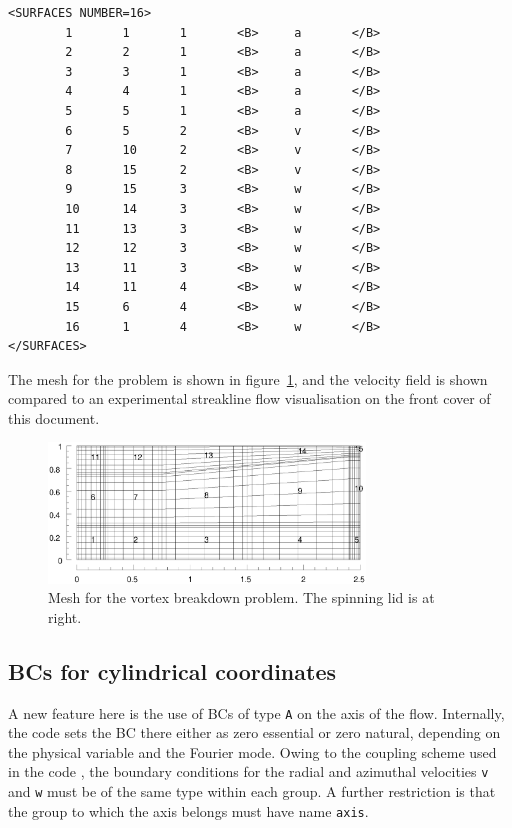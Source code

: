 \documentclass[11pt,a4paper]{report}
\begin{document}
{\begin{verbatim}
<SURFACES NUMBER=16>
        1       1       1       <B>     a       </B>
        2       2       1       <B>     a       </B>
        3       3       1       <B>     a       </B>
        4       4       1       <B>     a       </B>
        5       5       1       <B>     a       </B>
        6       5       2       <B>     v       </B>
        7       10      2       <B>     v       </B>
        8       15      2       <B>     v       </B>
        9       15      3       <B>     w       </B>
        10      14      3       <B>     w       </B>
        11      13      3       <B>     w       </B>
        12      12      3       <B>     w       </B>
        13      11      3       <B>     w       </B>
        14      11      4       <B>     w       </B>
        15      6       4       <B>     w       </B>
        16      1       4       <B>     w       </B>
</SURFACES>
\end{verbatim}
}

The mesh for the problem is shown in figure~\ref{vb1msh}, and the
velocity field is shown compared to an experimental streakline flow
visualisation on the front cover of this document.
\begin{figure}
\begin{center}
\includegraphics[width=0.75\textwidth]{vb1mesh.eps}
\end{center}
\caption{
\label{vb1msh}
  Mesh for the vortex breakdown problem.  The spinning lid is at right.
  }
\end{figure}

\subsection{BCs for cylindrical coordinates}

A new feature here is the use of BCs of type \verb+A+ on the axis of
the flow.  Internally, the code sets the BC there either as zero
essential or zero natural, depending on the physical variable and the
Fourier mode.  Owing to the coupling scheme used in the code
\cite{blsh04}, the boundary conditions for the radial and azimuthal
velocities \verb+v+ and \verb+w+ must be of the same type within each
group.  A further restriction is that the group to which the axis
belongs must have name \verb+axis+.
\end{document}
